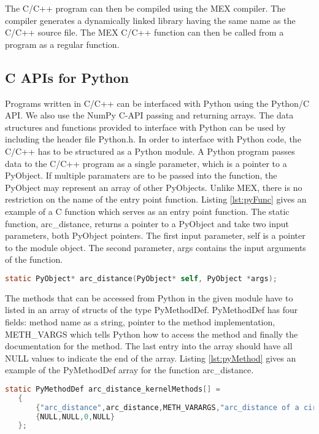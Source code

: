The C/C++ program can then be compiled using the MEX compiler. The compiler generates a dynamically linked library having the same name as the C/C++ source file. The MEX C/C++ function can then be called from a \matlab program as a regular \matlab function. 

\subsection{C APIs for Python}
Programs written in C/C++ can be interfaced with Python using the Python/C\cite{pyc} API. We also use the NumPy C-API\cite{numpyc} passing and returning arrays. The data structures and functions provided to interface with Python can be used by including the header file \textsf{Python.h}. In order to interface with Python code, the C/C++ has to be structured as a Python module. 
A Python program passes data to the C/C++ program as a single parameter, which is a pointer to a PyObject. If multiple paramaters are to be passed into the function, the PyObject may represent an array of other PyObjects. Unlike MEX, there is no restriction on the name of the entry point function. Listing \ref{lst:pyFunc} gives an example of a C function which serves as an entry point function. The static function, arc\_distance, returns a pointer to a PyObject and take two input parameters, both PyObject pointers. The first input parameter, \textsf{self} is a pointer to the module object. The second parameter, \textsf{args} contains the input arguments of the function. 
\begin{lstlisting}[float,language=C, label={lst:pyFunc}, caption={Signature of a function that can be called from Python}]
  static PyObject* arc_distance(PyObject* self, PyObject *args); 
\end{lstlisting}

The methods that can be accessed from Python in the given module have to listed in an array of structs of the type PyMethodDef. PyMethodDef has four fields: method name as a string, pointer to the method implementation, METH\_VARGS which tells Python how to access the method and finally the documentation for the method. The last entry into the array should have all NULL values to indicate the end of the array. Listing \ref{lst:pyMethod} gives an example of the PyMethodDef array for the function arc\_distance. 
\begin{lstlisting}[language=C, label={lst:pyMethod}, caption={An Example of the PyMethodDef struct }]
static PyMethodDef arc_distance_kernelMethods[] =
   {
       {"arc_distance",arc_distance,METH_VARARGS,"arc_distance of a circle. "},
       {NULL,NULL,0,NULL}
   };
\end{lstlisting}

